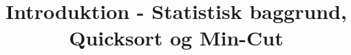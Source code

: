 
\title{Introduktion - Statistisk baggrund, Quicksort og Min-Cut}


\maketitle
\tableofcontents
\newpage


\newpage


\newpage


